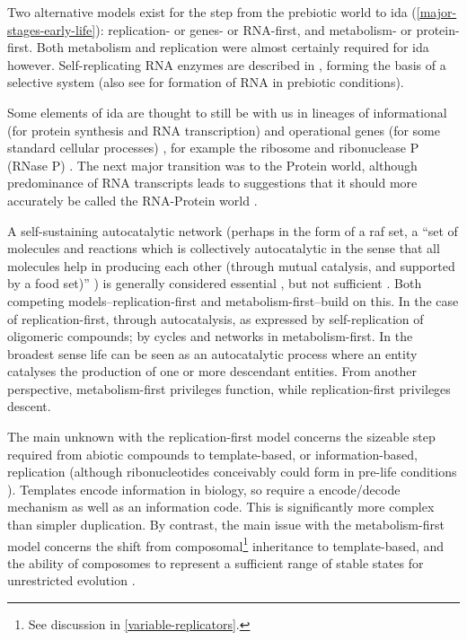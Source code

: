 Two alternative models exist for the step from the prebiotic world  to \gls{ida} (\cref{major-stages-early-life}): replication- or genes- or RNA-first, and metabolism- or protein-first. Both metabolism and replication were almost certainly required for \gls{ida} however. Self-replicating RNA enzymes are described in \textcite{Lincoln2009}, forming the basis of a selective system (also see \textcite{Cheng2010,Powner2009} for formation of RNA in prebiotic conditions). 

Some elements of \gls{ida}  are thought to still be with us in lineages of informational (for protein synthesis and RNA transcription) and operational genes (for some standard cellular processes) \parencite{Ragan2009}, for example the ribosome and ribonuclease P (RNase P) \parencite{Wilson2009}. The next major transition was to the Protein world, although predominance of RNA transcripts leads to suggestions that it should more accurately be called the RNA-Protein world \parencite{Altman2013}. 

A self-sustaining autocatalytic network (perhaps in the form of a \gls{raf} set, a ``set of molecules and reactions which is collectively autocatalytic in the sense that all molecules help in producing each other (through mutual catalysis, and supported by a food set)'' \parencite{Hordijk2011}) is generally considered essential \parencite{Pross2013}, but not sufficient \parencite{Hordijk2011}. Both competing models--replication-first and metabolism-first--build on this. In the case of replication-first, through autocatalysis, as expressed by self-replication of oligomeric compounds; by cycles and networks in metabolism-first. In the broadest sense life can be seen as an autocatalytic process where an entity catalyses the production of one or more descendant entities. From another perspective, metabolism-first privileges function, while replication-first privileges descent.

The main unknown with the replication-first model concerns the sizeable step required from abiotic compounds to template-based, or information-based, replication (although ribonucleotides conceivably could form in pre-life conditions \parencite{Powner2009}). Templates encode information in biology, so require a encode/decode mechanism as well as an information code. This is significantly more complex than simpler duplication. By contrast, the main issue with the metabolism-first model concerns the shift from composomal\footnote{See discussion in \cref{variable-replicators}.} inheritance to template-based, and the ability of composomes to represent a sufficient range of stable states for unrestricted evolution \parencite{Vasas2010}.


